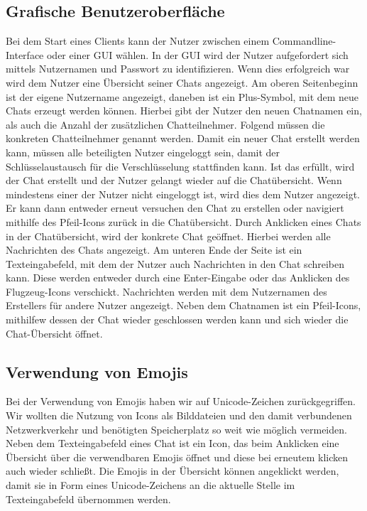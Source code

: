 
\author{Jan Grübener, Patrick Mischka}
\subsection{Grafische Benutzeroberfläche}

Bei dem Start eines Clients kann der Nutzer zwischen einem Commandline-Interface oder einer GUI wählen.
In der GUI wird der Nutzer aufgefordert sich mittels Nutzernamen und Passwort zu identifizieren. Wenn dies erfolgreich war wird dem Nutzer eine Übersicht seiner Chats angezeigt.
Am oberen Seitenbeginn ist der eigene Nutzername angezeigt, daneben ist ein Plus-Symbol, mit dem neue Chats erzeugt werden können. 
Hierbei gibt der Nutzer den neuen Chatnamen ein, als auch die Anzahl der zusätzlichen Chatteilnehmer. Folgend müssen die konkreten Chatteilnehmer genannt werden. 
Damit ein neuer Chat erstellt werden kann, müssen alle beteiligten Nutzer eingeloggt sein, damit der Schlüsselaustausch für die Verschlüsselung stattfinden kann.
Ist das erfüllt, wird der Chat erstellt und der Nutzer gelangt wieder auf die Chatübersicht. Wenn mindestens einer der Nutzer nicht eingeloggt ist, wird dies dem Nutzer angezeigt. Er kann dann entweder erneut versuchen den Chat zu erstellen oder navigiert mithilfe des Pfeil-Icons zurück in die Chatübersicht.
Durch Anklicken eines Chats in der Chatübersicht, wird der konkrete Chat geöffnet. Hierbei werden alle Nachrichten des Chats angezeigt. Am unteren Ende der Seite ist ein Texteingabefeld, mit dem der Nutzer auch Nachrichten in den Chat schreiben kann. Diese werden entweder durch eine Enter-Eingabe oder das Anklicken des Flugzeug-Icons verschickt. Nachrichten werden mit dem Nutzernamen des Erstellers für andere Nutzer angezeigt. 
Neben dem Chatnamen ist ein Pfeil-Icons, mithilfew dessen der Chat wieder geschlossen werden kann und sich wieder die Chat-Übersicht öffnet.

\author{Jan Grübener, Patrick Mischka}
\subsection{Verwendung von Emojis}

Bei der Verwendung von Emojis haben wir auf Unicode-Zeichen zurückgegriffen. 
Wir wollten die Nutzung von Icons als Bilddateien und den damit verbundenen Netzwerkverkehr und benötigten Speicherplatz so weit wie möglich vermeiden.
Neben dem Texteingabefeld eines Chat ist ein Icon, das beim Anklicken eine Übersicht über die verwendbaren Emojis öffnet und diese bei erneutem klicken auch wieder schließt. 
Die Emojis in der Übersicht können angeklickt werden, damit sie in Form eines Unicode-Zeichens an die aktuelle Stelle im Texteingabefeld übernommen werden.

